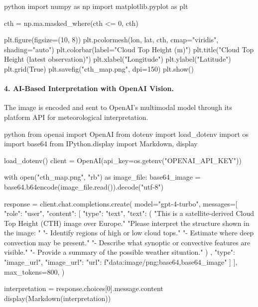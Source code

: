 \begin{codeonly}{python}
import numpy as np
import matplotlib.pyplot as plt

cth = np.ma.masked_where(cth <= 0, cth)

plt.figure(figsize=(10, 8))
plt.pcolormesh(lon, lat, cth, cmap="viridis", shading="auto")
plt.colorbar(label="Cloud Top Height (m)")
plt.title("Cloud Top Height (latest observation)")
plt.xlabel("Longitude")
plt.ylabel("Latitude")
plt.grid(True)
plt.savefig("cth_map.png", dpi=150)
plt.show()
\end{codeonly}

\paragraph{4. AI-Based Interpretation with OpenAI Vision.}

The image is encoded and sent to OpenAI's multimodal model through its platform API for meteorological interpretation.

\begin{codeonlysmall}{python}
from openai import OpenAI
from dotenv import load_dotenv
import os
import base64
from IPython.display import Markdown, display

load_dotenv()
client = OpenAI(api_key=os.getenv("OPENAI_API_KEY"))

with open("cth_map.png", "rb") as image_file:
    base64_image = base64.b64encode(image_file.read()).decode("utf-8")

response = client.chat.completions.create(
    model="gpt-4-turbo",
    messages=[
        {
            "role": "user",
            "content": [
                {
                    "type": "text",
                    "text": (
                     "This is a satellite-derived Cloud Top Height (CTH) image over Europe."
                        "Please interpret the structure shown in the image: \n"
                        "- Identify regions of high or low cloud tops.\n"
                        "- Estimate where deep convection may be present.\n"
                        "- Describe what synoptic or convective features are visible.\n"
                        "- Provide a summary of the possible weather situation."
                    )
                },
                {
                    "type": "image_url",
                    "image_url": {
                        "url": f"data:image/png;base64,{base64_image}"
                    }
                }
            ]
        }
    ],
    max_tokens=800,
)

interpretation = response.choices[0].message.content
display(Markdown(interpretation))
\end{codeonlysmall}


